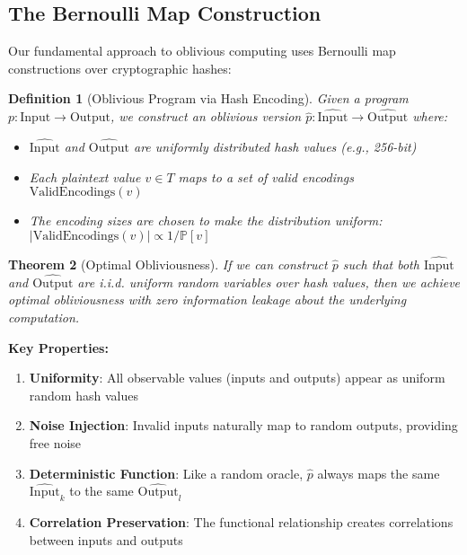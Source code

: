 \documentclass[11pt,final,hidelinks]{article}
\newtheorem{theorem}{Theorem}[section]
\newtheorem{definition}[theorem]{Definition}
\newcommand{\Prob}[1]{\mathbb{P}\left[#1\right]}
\begin{document}
\subsection{The Bernoulli Map Construction}

Our fundamental approach to oblivious computing uses Bernoulli map constructions over cryptographic hashes:

\begin{definition}[Oblivious Program via Hash Encoding]
Given a program $p: \text{Input} \to \text{Output}$, we construct an oblivious version $\hat{p}: \widehat{\text{Input}} \to \widehat{\text{Output}}$ where:
\begin{itemize}
    \item $\widehat{\text{Input}}$ and $\widehat{\text{Output}}$ are uniformly distributed hash values (e.g., 256-bit)
    \item Each plaintext value $v \in T$ maps to a set of valid encodings $\text{ValidEncodings}(v)$
    \item The encoding sizes are chosen to make the distribution uniform: $|\text{ValidEncodings}(v)| \propto 1/\Prob{v}$
\end{itemize}
\end{definition}

\begin{theorem}[Optimal Obliviousness]
If we can construct $\hat{p}$ such that both $\widehat{\text{Input}}$ and $\widehat{\text{Output}}$ are i.i.d. uniform random variables over hash values, then we achieve optimal obliviousness with zero information leakage about the underlying computation.
\end{theorem}

\textbf{Key Properties:}
\begin{enumerate}
    \item \textbf{Uniformity}: All observable values (inputs and outputs) appear as uniform random hash values
    \item \textbf{Noise Injection}: Invalid inputs naturally map to random outputs, providing free noise
    \item \textbf{Deterministic Function}: Like a random oracle, $\hat{p}$ always maps the same $\widehat{\text{Input}}_k$ to the same $\widehat{\text{Output}}_l$
    \item \textbf{Correlation Preservation}: The functional relationship creates correlations between inputs and outputs
\end{enumerate}
\end{document}

